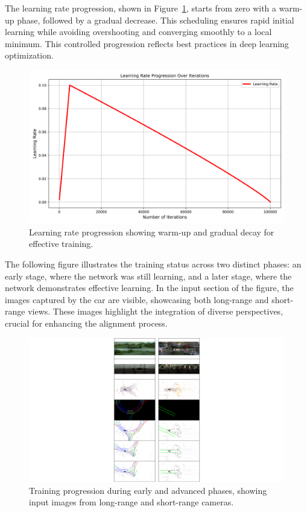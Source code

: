 The learning rate progression, shown in Figure~\ref{fig:learning_rate_2}, starts from zero with a warm-up phase, followed by a gradual decrease. This scheduling ensures rapid initial learning while avoiding overshooting and converging smoothly to a local minimum. This controlled progression reflects best practices in deep learning optimization.
\begin{figure}[H]
    \centering
    \includegraphics[width=0.75\linewidth]{LateX//figs/BEVlearning_rate_progression.png}
    \caption{Learning rate progression showing warm-up and gradual decay for effective training.}
    \label{fig:learning_rate_2}
\end{figure}

The following figure illustrates the training status across two distinct phases: an early stage, where the network was still learning, and a later stage, where the network demonstrates effective learning. In the input section of the figure, the images captured by the car are visible, showcasing both long-range and short-range views. These images highlight the integration of diverse perspectives, crucial for enhancing the alignment process.
\begin{figure}[H]
    \centering
    \includegraphics[width=1\linewidth]{LateX//figs/bev_traininig_phases.pdf}
    \caption{Training progression during early and advanced phases, showing input images from long-range and short-range cameras.}
    \label{fig:bev_training_phases}
\end{figure}

